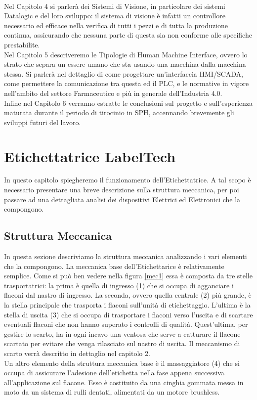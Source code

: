 \documentclass[12pt, a4paper, oneside]{book}
\begin{document}
\\Nel Capitolo 4 si parlerà dei Sistemi di Visione, in particolare dei sistemi Datalogic e del loro sviluppo: il sistema di visione è infatti un controllore necessario ed efficace nella verifica di tutti i pezzi e di tutta la produzione continua, assicurando che nessuna parte di questa sia non conforme alle specifiche prestabilite.
\\Nel Capitolo 5 descriveremo le Tipologie di Human Machine Interface, ovvero lo strato che separa un essere umano che sta usando una macchina dalla macchina stessa. Si parlerà nel dettaglio di come progettare un'interfaccia HMI/SCADA, come permettere la comunicazione tra questa ed il PLC, e le normative in vigore nell'ambito del settore Farmaceutico e più in generale dell'Industria 4.0.
\\Infine nel Capitolo 6 verranno estratte le conclusioni sul progetto e sull'esperienza maturata durante il periodo di tirocinio in SPH, accennando brevemente gli sviluppi futuri del lavoro.

\chapter{Etichettatrice LabelTech}
In questo capitolo spiegheremo il funzionamento dell'Etichettatrice. A tal scopo è necessario presentare una breve descrizione sulla struttura meccanica, per poi passare ad una dettagliata analisi dei dispositivi Elettrici ed Elettronici che la compongono.
\section{Struttura Meccanica}
In questa sezione descriviamo la struttura meccanica analizzando i vari elementi che la compongono.
La meccanica base dell'Etichettarice è relativamente semplice. Come si può ben vedere nella figura \ref{mec1} essa è composta da tre stelle trasportatrici: la prima è quella di ingresso (1) che si occupa di agganciare i flaconi dal nastro di ingresso. La seconda, ovvero quella centrale (2) più grande, è la stella principale che trasporta i flaconi sull'unità di etichettaggio. L'ultima è la stella di uscita (3) che si occupa di trasportare i flaconi verso l'uscita e di scartare eventuali flaconi che non hanno superato i controlli di qualità. Quest'ultima, per gestire lo scarto, ha in ogni incavo una ventosa che serve a catturare il flacone scartato per evitare che venga rilasciato sul nastro di uscita. Il meccanismo di scarto verrà descritto in dettaglio nel capitolo 2.
\\Un altro elemento della struttura meccanica base è il massaggiatore (4) che si occupa di assicurare l'adesione dell'etichetta nella fase appena successiva all'applicazione sul flacone. Esso è costituito da una cinghia gommata messa in moto da un sistema di rulli dentati, alimentati da un motore brushless.
\end{document}
